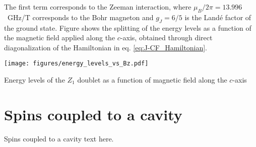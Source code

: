 The first term corresponds to the Zeeman interaction, where $\mu_B/2\pi=13.996$~GHz/T corresponds to the Bohr magneton and $g_J=6/5$ is the Landé factor of the \Er ground state. Figure  shows the splitting of the energy levels as a function of the magnetic field applied along the $c$-axis, obtained through direct diagonalization of the Hamiltonian in eq. \ref{eq:J-CF_Hamiltonian}. 

\begin{marginfigure}
    \texttt{[image: figures/energy\_levels\_vs\_Bz.pdf]}
    \caption{Energy levels of the $Z_1$ doublet as a function of magnetic field along the $c$-axis}
\end{marginfigure}


\section{Spins coupled to a cavity}
Spins coupled to a cavity text here.